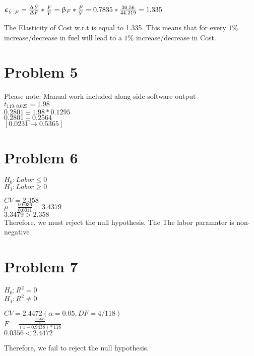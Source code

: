 \documentclass[11pt,letterpaper,english]{article}
\begin{document}
\begin{center}
$\upepsilon_{{\hat{Y}},F} = \frac {\mathit{\Updelta {\hat{Y}}}} {\mathit{\Updelta F}} * \frac F {\hat{Y}} = \upbeta_F * \frac F {\hat{Y}} = 0.7835 * \frac {30.56} {44.219} = 1.335$
\end{center}

The Elasticity of Cost w.r.t is equal to 1.335. This means that for every $1\%$ increase/decrease in fuel will lead to a $1\%$ increase/decrease in Cost.

\clearpage

\section*{Problem 5}
Please note: Manual work included along-side software output\\
$t_{119, 0.025} = 1.98$\\
$0.2801 \pm 1.98 * 0.1295$\\
$0.2801 \pm 0.2564$\\
$[0.0231 \rightarrow 0.5365]$

\section*{Problem 6}
$H_0: Labor \leq 0$\\
$H_1: Labor \geq 0$

\vspace{5mm}
\noindent
$\mathit{CV} = 2.358$\\
$\mu = {\frac {0.0036} {0.0011}} = 3.4379$\\
$3.3479 > 2.358$\\

\noindent
Therefore, we must reject the null hypothesis. The The labor paramater is non-negative

\section*{Problem 7}
$H_0: R^2 = 0$\\
$H_1: R^2 \neq 0$

\vspace{5mm}
\noindent
$CV = 2.4472 (\alpha = 0.05, DF = 4 / 118)$\\
\vspace{5mm}
$F = \frac {\frac {0.9438} 4} {(1-{0.9438}) * 118}$\\
\vspace{5mm}
$0.0356 < 2.4472$

\noindent
Therefore, we fail to reject the null hypothesis.
\end{document}
